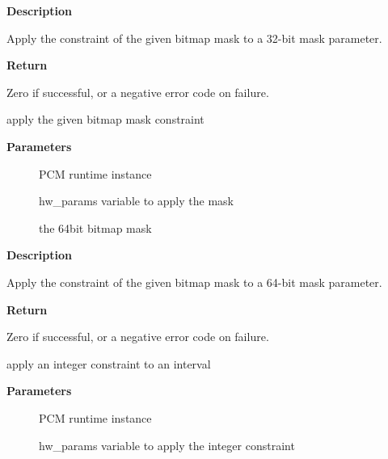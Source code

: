 \documentclass[a4paper,8pt,english]{sphinxmanual}
\begin{document}
\textbf{Description}

Apply the constraint of the given bitmap mask to a 32-bit mask parameter.

\textbf{Return}

Zero if successful, or a negative error code on failure.

\begin{fulllineitems}
\label{sound/kernel-api/alsa-driver-api:c.snd_pcm_hw_constraint_mask64}
apply the given bitmap mask constraint

\end{fulllineitems}


\textbf{Parameters}
\begin{description}
\item[{}] \leavevmode
PCM runtime instance

\item[{}] \leavevmode
hw\_params variable to apply the mask

\item[{}] \leavevmode
the 64bit bitmap mask

\end{description}

\textbf{Description}

Apply the constraint of the given bitmap mask to a 64-bit mask parameter.

\textbf{Return}

Zero if successful, or a negative error code on failure.

\begin{fulllineitems}
\label{sound/kernel-api/alsa-driver-api:c.snd_pcm_hw_constraint_integer}
apply an integer constraint to an interval

\end{fulllineitems}


\textbf{Parameters}
\begin{description}
\item[{}] \leavevmode
PCM runtime instance

\item[{}] \leavevmode
hw\_params variable to apply the integer constraint

\end{description}
\end{document}
